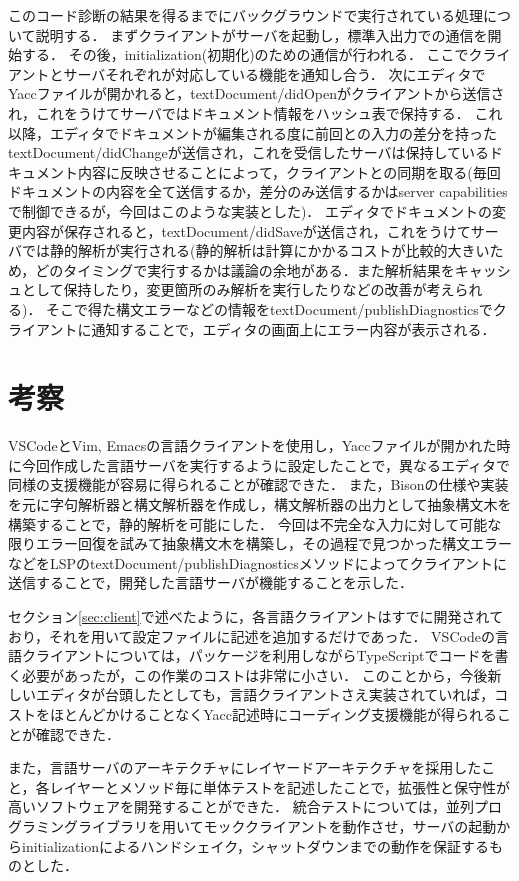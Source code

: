 \documentclass[fontsize=9bp,twocolumn,column_gap=2.36zw,a4paper,report]{jlreq}
\begin{document}
このコード診断の結果を得るまでにバックグラウンドで実行されている処理について説明する．
まずクライアントがサーバを起動し，標準入出力での通信を開始する．
その後，initialization(初期化)のための通信が行われる．
ここでクライアントとサーバそれぞれが対応している機能を通知し合う．
次にエディタでYaccファイルが開かれると，textDocument/didOpenがクライアントから送信され，これをうけてサーバではドキュメント情報をハッシュ表で保持する．
これ以降，エディタでドキュメントが編集される度に前回との入力の差分を持ったtextDocument/didChangeが送信され，これを受信したサーバは保持しているドキュメント内容に反映させることによって，クライアントとの同期を取る(毎回ドキュメントの内容を全て送信するか，差分のみ送信するかはserver capabilitiesで制御できるが，今回はこのような実装とした)．
エディタでドキュメントの変更内容が保存されると，textDocument/didSaveが送信され，これをうけてサーバでは静的解析が実行される(静的解析は計算にかかるコストが比較的大きいため，どのタイミングで実行するかは議論の余地がある．また解析結果をキャッシュとして保持したり，変更箇所のみ解析を実行したりなどの改善が考えられる)．
そこで得た構文エラーなどの情報をtextDocument/publishDiagnosticsでクライアントに通知することで，エディタの画面上にエラー内容が表示される．
\newline

\chapter{考察}

VSCodeとVim, Emacsの言語クライアントを使用し，Yaccファイルが開かれた時に今回作成した言語サーバを実行するように設定したことで，異なるエディタで同様の支援機能が容易に得られることが確認できた．
また，Bisonの仕様や実装を元に字句解析器と構文解析器を作成し，構文解析器の出力として抽象構文木を構築することで，静的解析を可能にした．
今回は不完全な入力に対して可能な限りエラー回復を試みて抽象構文木を構築し，その過程で見つかった構文エラーなどをLSPのtextDocument/publishDiagnosticsメソッドによってクライアントに送信することで，開発した言語サーバが機能することを示した．\par
セクション\ref{sec:client}で述べたように，各言語クライアントはすでに開発されており，それを用いて設定ファイルに記述を追加するだけであった．
VSCodeの言語クライアントについては，パッケージを利用しながらTypeScriptでコードを書く必要があったが，この作業のコストは非常に小さい．
このことから，今後新しいエディタが台頭したとしても，言語クライアントさえ実装されていれば，コストをほとんどかけることなくYacc記述時にコーディング支援機能が得られることが確認できた．\par
また，言語サーバのアーキテクチャにレイヤードアーキテクチャを採用したこと，各レイヤーとメソッド毎に単体テストを記述したことで，拡張性と保守性が高いソフトウェアを開発することができた．
統合テストについては，並列プログラミングライブラリを用いてモッククライアントを動作させ，サーバの起動からinitializationによるハンドシェイク，シャットダウンまでの動作を保証するものとした．
\newline
\end{document}
